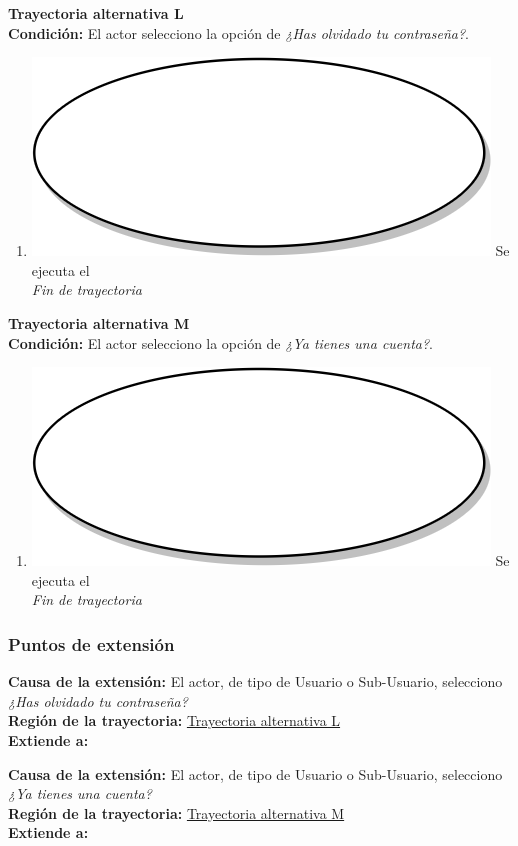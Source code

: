 \textbf{Trayectoria alternativa L} \label{cu2_ta_l}\\
\textbf{Condición:} El actor selecciono la opción de \textit{¿Has olvidado tu contraseña?}.\\
 \begin{enumerate}[label=L\arabic*]
    \item {\includegraphics[scale=.05]{Capitulo3/img/proceso.png} Se ejecuta el } \\
    \textit{Fin de trayectoria} \\
\end{enumerate}

\textbf{Trayectoria alternativa M} \label{cu2_ta_m}\\
\textbf{Condición:} El actor selecciono la opción de \textit{¿Ya tienes una cuenta?}.\\
 \begin{enumerate}[label=M\arabic*]
    \item {\includegraphics[scale=.05]{Capitulo3/img/proceso.png} Se ejecuta el }\\
    \textit{Fin de trayectoria} \\
\end{enumerate}

\subsubsection{Puntos de extensión}
\noindent \textbf{Causa de la extensión:} El actor, de tipo de Usuario o Sub-Usuario, selecciono \textit{¿Has olvidado tu contraseña?} \\
\textbf{Región de la trayectoria:} \hyperref[cu2_ta_l]{Trayectoria alternativa L} \\
\textbf{Extiende a:}  \\ \par

\noindent \textbf{Causa de la extensión:} El actor, de tipo de Usuario o Sub-Usuario, selecciono \textit{¿Ya tienes una cuenta?} \\
\textbf{Región de la trayectoria:} \hyperref[cu2_ta_m]{Trayectoria alternativa M} \\
\textbf{Extiende a:} 
